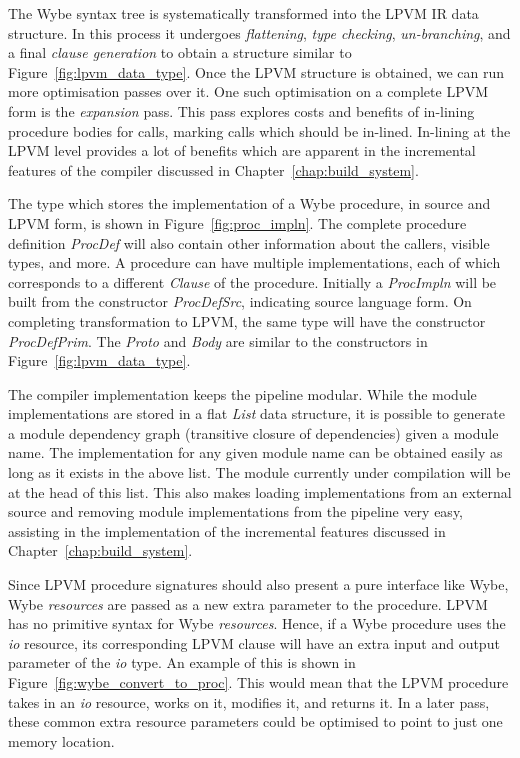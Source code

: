 The Wybe syntax tree is systematically transformed into the LPVM IR data
structure. In this process it undergoes \textit{flattening}, \textit{type
  checking}, \textit{un-branching}, and a final \textit{clause generation} to
obtain a structure similar to Figure~\ref{fig:lpvm_data_type}. Once the LPVM
structure is obtained, we can run more optimisation passes over it. One such
optimisation on a complete LPVM form is the \textit{expansion} pass. This pass
explores costs and benefits of in-lining procedure bodies for calls, marking
calls which should be in-lined. In-lining at the LPVM level provides a lot of
benefits which are apparent in the incremental features of the compiler
discussed in Chapter~\ref{chap:build_system}.

The type which stores the implementation of a Wybe procedure, in source and
LPVM form, is shown in Figure~\ref{fig:proc_impln}. The complete procedure
definition \textit{ProcDef} will also contain other information about the
callers, visible types, and more. A procedure can have multiple
implementations, each of which corresponds to a different \textit{Clause} of
the procedure. Initially a \textit{ProcImpln} will be built from the
constructor \textit{ProcDefSrc}, indicating source language form. On completing
transformation to LPVM, the same type will have the constructor
\textit{ProcDefPrim}. The \textit{Proto} and \textit{Body} are similar to the
constructors in Figure~\ref{fig:lpvm_data_type}.

The compiler implementation keeps the pipeline modular. While the module
implementations are stored in a flat \textit{List} data structure, it is
possible to generate a module dependency graph (transitive closure of
dependencies) given a module name. The implementation for any given module name
can be obtained easily as long as it exists in the above list. The module
currently under compilation will be at the head of this list. This also makes
loading implementations from an external source and removing module
implementations from the pipeline very easy, assisting in the implementation of
the incremental features discussed in Chapter~\ref{chap:build_system}.

Since LPVM procedure signatures should also present a pure interface like Wybe,
Wybe \textit{resources} are passed as a new extra parameter to the
procedure. LPVM has no primitive syntax for Wybe \textit{resources}. Hence, if
a Wybe procedure uses the \textit{io} resource, its corresponding LPVM clause
will have an extra input and output parameter of the \textit{io} type. An
example of this is shown in Figure~\ref{fig:wybe_convert_to_proc}. This would
mean that the LPVM procedure takes in an \textit{io} resource, works on it,
modifies it, and returns it. In a later pass, these common extra resource
parameters could be optimised to point to just one memory location.

